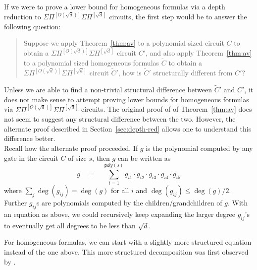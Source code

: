 \documentclass{beatcs}
\newcommand{\poly}{\mathsf{poly}}
\newcommand{\spaced}[1]{\quad#1\quad}
\newcommand{\SPSPfanin}[2]{\Sigma\Pi^{[#1]}\Sigma\Pi^{[#2]}}
\begin{document}
If we were to prove a lower bound for homogeneous formulas via a depth reduction to $\SPSPfanin{O(\sqrt{d})}{\sqrt{d}}$ circuits, the first step would be to answer the following question:
\begin{quote}
Suppose we apply Theorem~\ref{thm:av} to a polynomial sized circuit $C$ to obtain a $\SPSPfanin{O(\sqrt{d})}{\sqrt{d}}$ circuit $C'$, and also apply Theorem~\ref{thm:av} to a polynomial sized homogeneous formulas $\tilde{C}$ to obtain a $\SPSPfanin{O(\sqrt{d})}{\sqrt{d}}$ circuit $\tilde{C}'$, how is $\tilde{C}'$ structurally different from $C'$?
\end{quote}
Unless we are able to find a non-trivial structural difference between $\tilde{C}'$ and $C'$, it does not make sense to attempt proving lower bounds for homogeneous formulas via $\SPSPfanin{O(\sqrt{d})}{\sqrt{d}}$ circuits. The original proof of \cite{Tav13} of Theorem~\ref{thm:av} does not seem to suggest any structural difference between the two. However, the alternate proof described in Section~\ref{sec:depth-red} allows one to understand this difference better. \\

Recall how the alternate proof proceeded. If $g$ is the polynomial computed by any gate in the circuit $C$ of size $s$, then $g$ can be written as
\[
g\spaced{=} \sum_{i=1}^{\poly(s)} g_{i1} \cdot g_{i2} \cdot g_{i3} \cdot g_{i4} \cdot g_{i5}
\]
where $\sum_j \deg(g_{ij}) = \deg(g)$ for all $i$ and $\deg(g_{ij})\leq \deg(g)/2$. Further $g_{ij}$s are polynomials computed by the children/grandchildren of $g$. With an equation as above, we could recursively keep expanding the larger degree $g_{ij}$'s to eventually get all degrees to be less than $\sqrt{d}$. 

For homogeneous formulas, we can start with a slightly more structured equation instead of the one above. This more structured decomposition was first observed by \cite{HY11a}.  
\end{document}
